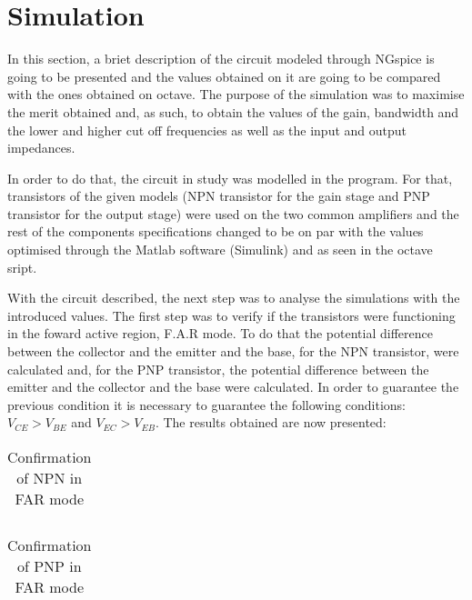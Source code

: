 \section{Simulation}
\label{sec:simulation}

\par In this section, a briet description of the circuit modeled through NGspice is going to be presented and the values obtained on it are going to be compared with the ones obtained on octave. The purpose of the simulation was to maximise the merit obtained and, as such, to obtain the values of the gain, bandwidth and the lower and higher  cut off frequencies as well as the input and output impedances.

\par In order to do that, the circuit in study was modelled in the program. For that, transistors of the given models (NPN transistor for the gain stage and PNP transistor for the output stage) were used on the two common amplifiers and the rest of the components specifications changed to be on par with the values optimised through the Matlab software (Simulink) and as seen in the octave sript.

\par With the circuit described, the next step was to analyse the simulations with the introduced values. The first step was to verify if the transistors were functioning in the foward active region, F.A.R mode. To do that the potential difference between the collector and the emitter and the base, for the NPN transistor, were calculated and, for the PNP transistor, the potential difference between the emitter and the collector and the base were calculated. In order to guarantee the previous condition it is necessary to guarantee the following conditions: $V_{CE}>V_{BE}$ and $V_{EC}>V_{EB}$. The results obtained are now presented:


\begin{table}[H]
  \centering
  \begin{tabular}{|l|r|}
    \hline    
   
     \end{tabular}
  \caption{Confirmation of NPN in FAR mode}
 
\end{table}


\begin{table}[H]
  \centering
  \begin{tabular}{|l|r|}
    \hline    
   
     \end{tabular}
  \caption{Confirmation of PNP in FAR mode}
    
\end{table}


